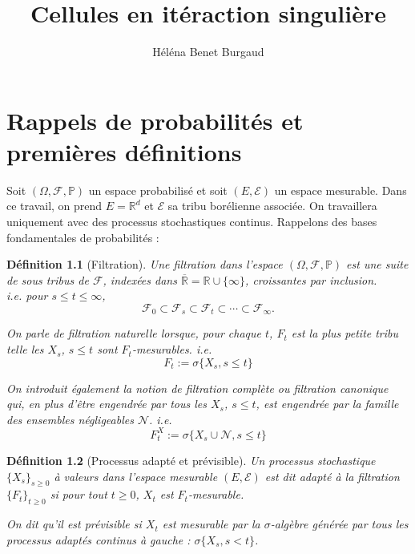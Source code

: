 \documentclass[openany]{book}
\title{Cellules en itéraction singulière}
\author{Héléna Benet Burgaud}
\newcommand{\F}{\mathscr{F}}
\newcommand{\N}{\mathscr{N}}
\newcommand{\carE}{\mathscr{E}}
\renewcommand{\P}{\mathds{P}}
\newcommand{\R}{\mathbb{R}}
\newcommand{\1}{\mathbbm{1}}
\theoremstyle{thmfont}
\theoremstyle{deffont}
\newtheorem{definition}[definition]{Définition}
\theoremstyle{thmfont}
\theoremstyle{deffont}
\begin{document}

\tableofcontents
\clearpage
{} %
\setcounter{page}{1}
\let\cleardoublepage\relax
\chapter{Rappels de probabilités et premières définitions}

Soit $(\Omega, \F, \P )$ un espace probabilisé et soit $(E, \carE)$ un espace mesurable.{\color{red} Dans ce travail, on prend $E = \R^d$ et $\carE$ sa tribu borélienne associée. On travaillera uniquement avec des processus stochastiques continus. Rappelons des bases fondamentales de probabilités :}

\begin{definition}[Filtration] Une \textit{filtration} dans l'espace $(\Omega, \F, \P )$ est une suite de sous tribus de $\F$, indexées dans $\overline{\R} = \R \cup \{\infty\}$, croissantes par inclusion.\\
i.e. pour $s \leq t \leq \infty$,
$$\F_0 \subset \F_s \subset \F_t\subset \cdots \subset \F_\infty .$$

On parle de \textit{filtration naturelle} lorsque, pour chaque $t$, $F_t$ est la plus petite tribu telle les $X_s$, $s\leq t$ sont $F_t$-mesurables. i.e.
$$F_t := \sigma\{X_s, s\leq t\}$$

On introduit également la notion de \textit{filtration complète} ou
\textit{filtration canonique} qui, en plus d'être engendrée par tous les $X_s$, $s \leq t$, est engendrée par la famille des ensembles négligeables $\N$. i.e.
$$F^X_t := \sigma\{X_s\cup \N, s\leq t\}$$

\label{def:filtration}
\end{definition}

\begin{definition}[Processus adapté et prévisible] Un processus stochastique $\{X_s\}_{s\ge0}$ à valeurs dans l'espace mesurable $(E, \carE)$ est dit \textit{adapté} à la filtration $\{F_t\}_{t\geq0}$ si pour tout $t\geq0$, $X_t$ est $F_t$-mesurable.

  On dit qu'il est \textit{prévisible} si $X_t$ est mesurable par la $\sigma$-algèbre générée par tous les processus adaptés continus à gauche : $\sigma\{X_s, s<t\}$.
\label{def:pr_adapte}
\end{definition}
\end{document}
